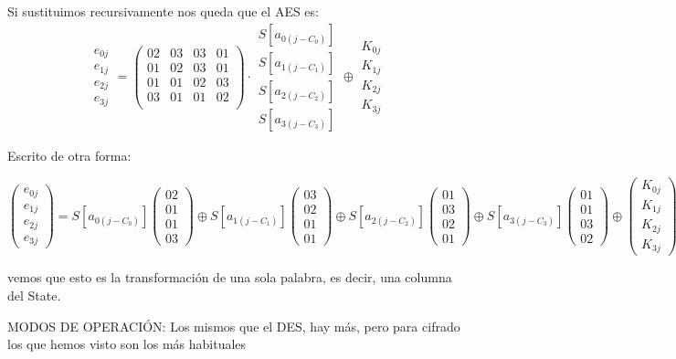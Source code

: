 Si sustituimos recursivamente nos queda que el AES es:
$$\begin{matrix}
	e_{0j}\\
	e_{1j}\\
	e_{2j}\\
	e_{3j}
\end{matrix} = \left(\begin{matrix}
02 & 03 & 03 & 01\\
01 & 02 & 03 & 01\\
01 & 01 & 02 & 03\\
03 & 01 & 01 & 02\\
\end{matrix}\right) \cdot \begin{matrix}
S[a_{0(j-C_0)}]\\S[a_{1(j-C_1)}]\\S[a_{2(j-C_2)}]\\S[a_{3(j-C_3)}]\end{matrix} \oplus \begin{matrix}
K_{0j}\\
K_{1j}\\
K_{2j}\\
K_{3j}
\end{matrix}
$$

Escrito de otra forma:

$$\left(\begin{matrix}
e_{0j}\\e_{1j}\\e_{2j}\\e_{3j}
\end{matrix}\right) = S[a_{0(j-C_0)}] \left(\begin{matrix}
02\\01\\01\\03
\end{matrix}\right) \oplus S[a_{1(j-C_1)}] \left(\begin{matrix}
03\\02\\01\\01
\end{matrix}\right) \oplus S[a_{2(j-C_2)}] \left(\begin{matrix}
01\\03\\02\\01
\end{matrix}\right) \oplus S[a_{3(j-C_3)}] \left(\begin{matrix}
01\\01\\03\\02
\end{matrix}\right) \oplus \left(\begin{matrix}
K_{0j}\\K_{1j}\\K_{2j}\\K_{3j}
\end{matrix}\right)$$

vemos que esto es la transformación de una sola palabra, es decir, una columna del State.


MODOS DE OPERACIÓN: Los mismos que el DES, hay más, pero para cifrado los que hemos visto son los más habituales
